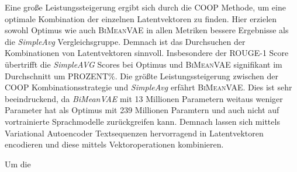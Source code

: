Eine große Leistungssteigerung ergibt sich durch die COOP Methode, um eine optimale Kombination der einzelnen Latentvektoren zu finden.
Hier erzielen sowohl Optimus wie auch \textsc{BiMeanVAE} in allen Metriken bessere Ergebnisse als die \textit{SimpleAvg} Vergleichsgruppe.
Demnach ist das Durchsuchen der Kombinationen von Latentvektoren sinnvoll. 
Insbesondere der ROUGE-1 Score übertrifft die \textit{SimpleAVG} Scores bei Optimus und \textsc{BiMeanVAE} signifikant im Durchschnitt um PROZENT\%.
Die größte Leistungssteigerung zwischen der COOP Kombinationsstrategie und \textit{SimpleAvg} erfährt \textsc{BiMeanVAE}.
Dies ist sehr beeindruckend, da \textit{BiMeanVAE} mit 13 Millionen Parametern weitaus weniger Parameter hat als Optimus mit 239 Millionen Paramtern und auch nicht auf vortrainierte Sprachmodelle zurückgreifen kann.
Demnach lassen sich mittels Variational Autoencoder Textsequenzen hervorragend in Latentvektoren encodieren und diese mittels Vektoroperationen kombinieren.


Um die 




\pagebreak
